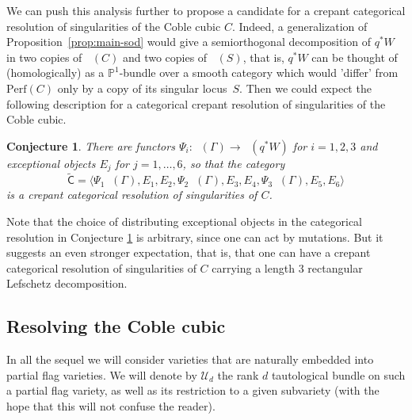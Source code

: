 \documentclass[11pt]{article}
\newcommand{\Perf}{\mathrm{Perf}}
\let\mathcal\mathscr
\theoremstyle{plain}
\newtheorem{conjecture}[theorem]{Conjecture}
\theoremstyle{definition}
\newcommand{\cat}[1]{\mathsf{#1}}
\newcommand{\sod}[1]{\langle #1 \rangle}
\DeclareMathOperator{\Db}{{\cat{D}^{\mathrm{b}}}}
\newcommand{\PP}{\mathbb{P}}
\newcommand{\sheaf}[1]{\mathcal{#1}}
\newcommand{\ku}{\sheaf{U}}
\begin{document}
We can push this analysis further to propose a candidate for a crepant categorical resolution of singularities
of the Coble cubic $C$. Indeed, a generalization of Proposition~\ref{prop:main-sod} would give a semiorthogonal
decomposition of $q^* W$ in two copies of $\Db(C)$ and two copies of $\Db(S)$, that is, $q^* W$ can be thought of
(homologically) as a $\PP^1$\nobreakdash-bundle over a smooth category which would 'differ' from $\Perf(C)$ only
by a copy of its singular locus~$S$. Then we could expect the following description for a categorical crepant
resolution of singularities of the Coble cubic.

\begin{conjecture}\label{conj:resol-Coble}
There are functors $\Psi_i: \Db(\Gamma) \to \Db(q^* W)$ for $i=1,2,3$ and exceptional objects $E_j$
for $j=1,\ldots,6$, so that the category
\[
\widetilde{\cat{C}}= \sod{\Psi_1 \Db(\Gamma),E_1,E_2,\Psi_2 \Db(\Gamma),E_3,E_4,\Psi_3 \Db(\Gamma),E_5,E_6}
\]
is a crepant categorical resolution of singularities of $C$.
\end{conjecture}
Note that the choice of distributing exceptional objects in the categorical resolution in Conjecture
\ref{conj:resol-Coble} is arbitrary, since one can act by mutations. But it suggests an even stronger
expectation, that is, that one can have a crepant categorical resolution of singularities of $C$
carrying a length 3 rectangular Lefschetz decomposition.

\subsection{Resolving the Coble cubic}
In all the sequel we will consider varieties that are naturally embedded into partial
flag varieties. We will denote by $\ku_d$ the rank $d$ tautological bundle on such a
partial flag variety, as well as its restriction to a given subvariety (with the hope
that this will not confuse the reader).
\end{document}
